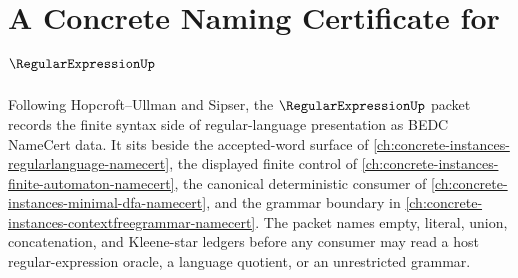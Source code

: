 \chapter{A Concrete Naming Certificate for $\RegularExpressionUp$}
\label{ch:concrete-instances-regular-expression-namecert}

Following Hopcroft--Ullman and Sipser, the $\RegularExpressionUp$ packet records the finite syntax side of regular-language presentation as BEDC NameCert data. It sits beside the accepted-word surface of \autoref{ch:concrete-instances-regularlanguage-namecert}, the displayed finite control of \autoref{ch:concrete-instances-finite-automaton-namecert}, the canonical deterministic consumer of \autoref{ch:concrete-instances-minimal-dfa-namecert}, and the grammar boundary in \autoref{ch:concrete-instances-contextfreegrammar-namecert}. The packet names empty, literal, union, concatenation, and Kleene-star ledgers before any consumer may read a host regular-expression oracle, a language quotient, or an unrestricted grammar.

